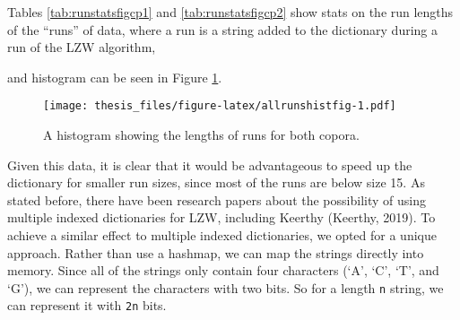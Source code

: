\documentclass[12pt,twoside]{reedthesis}
\begin{document}
Tables \ref{tab:runstatsfigcp1} and \ref{tab:runstatsfigcp2} show stats on the run lengths of the ``runs'' of data, where a run is a string added to the dictionary during a run of the LZW algorithm,
\begin{table}[!h]
\centering
{}
\end{table}
\begin{table}[!h]
\centering
{}
\end{table}
and histogram can be seen in Figure \ref{fig:allrunshistfig}.
\begin{table}[!h]
\centering
{}
\end{table}
\begin{figure}
\centering
\texttt{[image: thesis\_files/figure-latex/allrunshistfig-1.pdf]}
\caption{\label{fig:allrunshistfig}A histogram showing the lengths of runs for both copora.}
\end{figure}
Given this data, it is clear that it would be advantageous to speed up the dictionary for smaller run sizes, since most of the runs are below size 15. As stated before, there have been research papers about the possibility of using multiple indexed dictionaries for LZW, including Keerthy (Keerthy, 2019).
To achieve a similar effect to multiple indexed dictionaries, we opted for a unique approach. Rather than use a hashmap, we can map the strings directly into memory. Since all of the strings only contain four characters (`A', `C', `T', and `G'), we can represent the characters with two bits. So for a length \texttt{n} string, we can represent it with \texttt{2n} bits.
\end{document}
